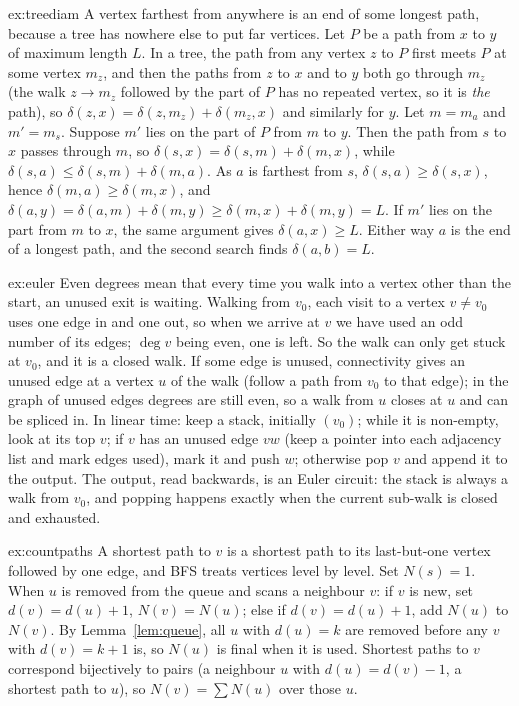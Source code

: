 \begin{solution}{ex:treediam}
\idea A vertex farthest from anywhere is an end of some longest path, because a tree has nowhere else to put far vertices.
\writeup Let $P$ be a path from $x$ to $y$ of maximum length $L$. In a tree, the path from any vertex $z$ to $P$ first meets $P$ at some vertex $m_z$, and then the paths from $z$ to $x$ and to $y$ both go through $m_z$ (the walk $z\to m_z$ followed by
the part of $P$ has no repeated vertex, so it is \emph{the} path), so $\delta(z,x)=\delta(z,m_z)+\delta(m_z,x)$ and similarly for $y$. Let $m=m_a$ and $m'=m_s$. Suppose $m'$ lies on the part of $P$ from $m$ to $y$. Then the path from $s$ to $x$ passes through $m$,
so $\delta(s,x)=\delta(s,m)+\delta(m,x)$, while $\delta(s,a)\le\delta(s,m)+\delta(m,a)$. As $a$ is farthest from $s$, $\delta(s,a)\ge\delta(s,x)$, hence $\delta(m,a)\ge\delta(m,x)$, and
$\delta(a,y)=\delta(a,m)+\delta(m,y)\ge\delta(m,x)+\delta(m,y)=L$. If $m'$ lies on the part from $m$ to $x$, the same argument gives $\delta(a,x)\ge L$. Either way $a$ is the end of a longest path, and the second search finds $\delta(a,b)=L$.
\end{solution}

\begin{solution}{ex:euler}
\idea Even degrees mean that every time you walk into a vertex other than the start, an unused exit is waiting.
\writeup Walking from $v_0$, each visit to a vertex $v\ne v_0$ uses one edge in and one out, so when we arrive at $v$ we have used an odd number of its edges; $\deg v$ being even, one is left. So the walk can only get stuck at $v_0$, and
it is a closed walk. If some edge is unused, connectivity gives an unused edge at a vertex $u$ of the walk (follow a path from $v_0$ to that edge); in the graph of unused edges degrees are still even, so a walk from $u$ closes at $u$ and
can be spliced in. In linear time: keep a stack, initially $(v_0)$; while it is non-empty, look at its top $v$; if $v$ has an unused edge $vw$ (keep a pointer into each adjacency list and mark edges used), mark it and push $w$; otherwise pop $v$
and append it to the output. The output, read backwards, is an Euler circuit: the stack is always a walk from $v_0$, and popping happens exactly when the current sub-walk is closed and exhausted.
\end{solution}

\begin{solution}{ex:countpaths}
\idea A shortest path to $v$ is a shortest path to its last-but-one vertex followed by one edge, and BFS treats vertices level by level.
\writeup Set $N(s)=1$. When $u$ is removed from the queue and scans a neighbour $v$: if $v$ is new, set $d(v)=d(u)+1$, $N(v)=N(u)$; else if $d(v)=d(u)+1$, add $N(u)$ to $N(v)$. By Lemma~\ref{lem:queue}, all $u$ with $d(u)=k$ are removed before any $v$ with
$d(v)=k+1$ is, so $N(u)$ is final when it is used. Shortest paths to $v$ correspond bijectively to pairs (a neighbour $u$ with $d(u)=d(v)-1$, a shortest path to $u$), so $N(v)=\sum N(u)$ over those $u$.
\end{solution}

